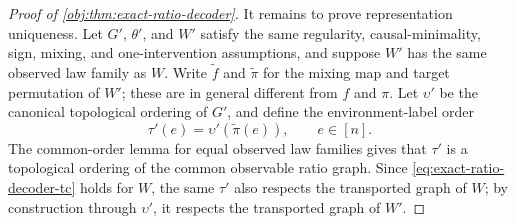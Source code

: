 \documentclass[11pt]{article}
\begin{document}
\begin{proof}[Proof of \cref{obj:thm:exact-ratio-decoder}]
It remains to prove representation uniqueness. Let \(G'\), \(\theta'\), and \(W'\) satisfy the same regularity, causal-minimality, sign, mixing, and one-intervention assumptions, and suppose \(W'\) has the same observed law family as \(W\). Write \(\widetilde f\) and \(\widetilde\pi\) for the mixing map and target permutation of \(W'\); these are in general different from \(f\) and \(\pi\). Let \(\upsilon'\) be the canonical topological ordering of \(G'\), and define the environment-label order
\[
\tau'(e)=\upsilon'(\widetilde\pi(e)),
\qquad e\in[n].
\]
The common-order lemma for equal observed law families gives that \(\tau'\) is a topological ordering of the common observable ratio graph. Since \cref{eq:exact-ratio-decoder-tc} holds for \(W\), the same \(\tau'\) also respects the transported graph of \(W\); by construction through \(\upsilon'\), it respects the transported graph of \(W'\). %


\end{proof}
\end{document}
